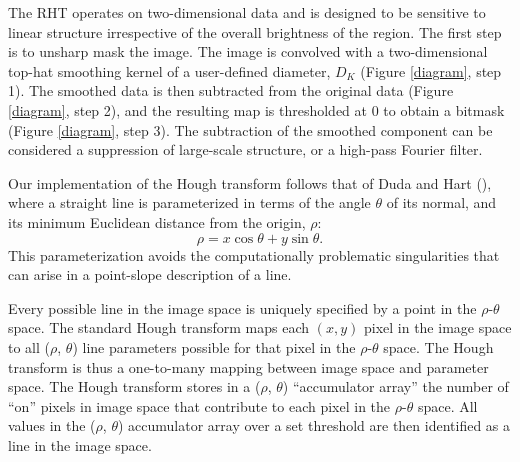 \documentclass[12pt]{emulateapj}
\newcommand{\beq}{\begin{equation}}
\newcommand{\eeq}{\end{equation}}
\begin{document}
The RHT operates on two-dimensional data and is designed to be sensitive to linear structure irrespective of the overall brightness of the region. The first step is to unsharp mask the image. The image is convolved with a two-dimensional top-hat smoothing kernel of a user-defined diameter, $D_K$ (Figure \ref{diagram}, step 1). The smoothed data is then subtracted from the original data (Figure \ref{diagram}, step 2), and the resulting map is thresholded at 0 to obtain a bitmask (Figure \ref{diagram}, step 3). The subtraction of the smoothed component can be considered a suppression of large-scale structure, or a high-pass Fourier filter.

Our implementation of the Hough transform follows that of Duda and Hart (\citeyear{Duda:1972uj}), where a straight line is parameterized in terms of the angle $\theta$ of its normal, and its minimum Euclidean distance from the origin, $\rho$:
\beq
\rho = x\cos\theta + y\sin\theta. 
\eeq
\noindent This parameterization avoids the computationally problematic singularities that can arise in a point-slope description of a line.

Every possible line in the image space is uniquely specified by a point in the ${\rho}$-${\theta}$ space. The standard Hough transform maps each $(x, y)$ pixel in the image space to all (${\rho}$, ${\theta}$) line parameters possible for that pixel in the $\rho$-$\theta$ space. The Hough transform is thus a one-to-many mapping between image space and parameter space. The Hough transform stores in a (${\rho}$, ${\theta}$) ``accumulator array'' the number of ``on'' pixels in image space that contribute to each pixel in the $\rho$-$\theta$ space. All values in the (${\rho}$, ${\theta}$) accumulator array over a set threshold are then identified as a line in the image space.
\end{document}
